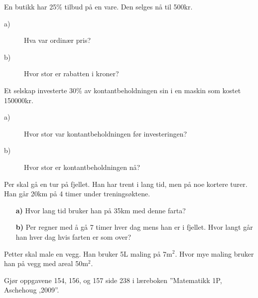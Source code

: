 \documentclass[a4, 11pt, twoside]{article}
\theoremstyle{definition}
\begin{document}
\begin{Exercise}
  En butikk har 25\% tilbud på en vare. Den selges nå til 500kr.
\begin{description}
\item[a)] Hva var ordinær pris?
\item[b)] Hvor stor er rabatten i kroner?
\end{description}
\end{Exercise}

\begin{Exercise}
  Et selskap investerte 30\% av kontantbeholdningen sin i en maskin
  som kostet 150000kr.
  \begin{description}
    \item[a)] Hvor stor var kontantbeholdningen før investeringen?
    \item[b)] Hvor stor er kontantbeholdningen nå?
  \end{description}
\end{Exercise}


\begin{Exercise}
Per skal gå en tur på fjellet. Han har trent i lang tid, men på noe
kortere turer. Han går 20km på 4 timer under treningsøktene.
\begin{itemize}
\item[\bf a)] Hvor lang tid bruker han på 35km med denne farta?
\item[\bf b)] Per regner med å gå 7 timer hver dag mens han er i fjellet.
Hvor langt går han hver dag hvis farten er som over?
\end{itemize}
\end{Exercise}


\begin{Exercise}
Petter skal male en vegg. Han bruker 5L maling på 7m$^2$. Hvor mye
maling bruker han på vegg med areal 50m$^2$.
\end{Exercise}

\begin{Exercise}
Gjør oppgavene 154, 156, og 157 side 238 i læreboken ''Matematikk 1P, Aschehoug ,2009''.
\end{Exercise}
\end{document}
